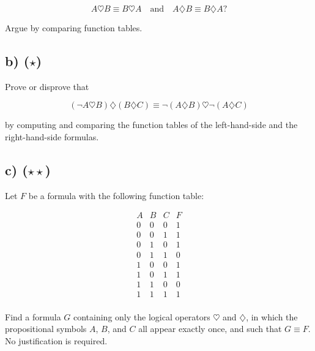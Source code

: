 \documentclass[unicode,11pt,a4paper,oneside,numbers=endperiod,openany]{scrartcl}
\newcommand{\myex}[3]{
    \ifthenelse{\equal{#1}{true}}{
        \begin{equation} \label{#2} \begin{aligned} #3 \end{aligned} \end{equation}
    }{
        \begin{equation*} \label{#2} \begin{aligned} #3 \end{aligned} \end{equation*}
    }
}
\begin{document}
\[
A \heartsuit B \equiv B \heartsuit A 
\quad \text{and} \quad 
A \diamondsuit B \equiv B \diamondsuit A ?
\]

\noindent Argue by comparing function tables.
    

\subsection{b) (\(\star\))} 
Prove or disprove that

\[
(\neg A \heartsuit B) \diamondsuit (B \diamondsuit C) 
\equiv 
\neg(A \diamondsuit B) \heartsuit \neg(A \diamondsuit C)
\]

\noindent by computing and comparing the function tables of the left-hand-side 
and the right-hand-side formulas.

    
\subsection{c) (\(\star \star\))} 
Let \( F \) be a formula with the following function table:

\[
\begin{array}{c|c|c||c}
A & B & C & F \\
\hline
0 & 0 & 0 & 1 \\
0 & 0 & 1 & 1 \\
0 & 1 & 0 & 1 \\
0 & 1 & 1 & 0 \\
1 & 0 & 0 & 1 \\
1 & 0 & 1 & 1 \\
1 & 1 & 0 & 0 \\
1 & 1 & 1 & 1 \\
\end{array}
\]

\noindent Find a formula \( G \) containing only the logical operators \(\heartsuit\) and \(\diamondsuit\), 
in which the propositional symbols \( A \), \( B \), and \( C \) all appear exactly once, 
and such that \( G \equiv F \). 
No justification is required.





\end{document}
